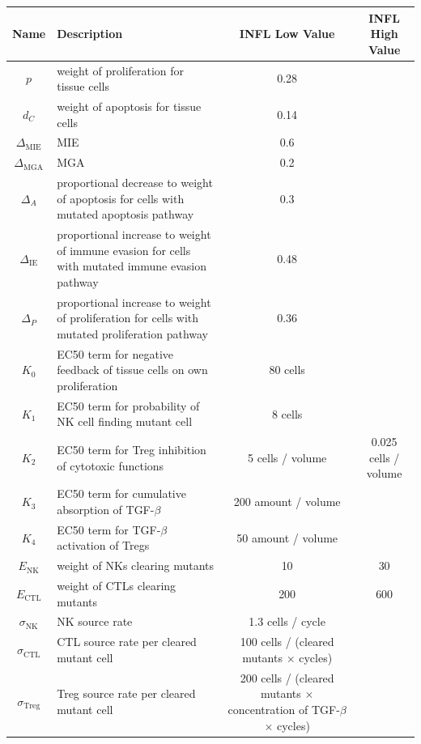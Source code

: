 \documentclass[11pt, a4paper, preprint]{article}
\begin{document}
\begin{table}[H]
\begin{center}
 \begin{tabular}{|| c | p{7cm} | c | c ||} 
 \hline
 Name & Description & INFL Low Value & INFL High Value  \\ [0.5ex] 
 \hline\hline
  $p$ & weight of proliferation for tissue cells & 0.28 & \\ 
 \hline
 $d_C$  & weight of apoptosis for tissue cells & 0.14 & \\
 \hline
$\Delta_\text{MIE}$ & MIE & 0.6 & \\
 \hline
 $\Delta_\text{MGA}$ & MGA  & 0.2 &  \\
 \hline
  $\Delta_A$ & proportional decrease to weight of apoptosis for cells with mutated apoptosis pathway & 0.3 &  \\
  \hline
  $\Delta_\text{IE}$ & proportional increase to weight of immune evasion for cells with mutated immune evasion pathway & 0.48 &  \\
  \hline
  $\Delta_P$ & proportional increase to weight of proliferation for cells with mutated proliferation pathway & 0.36 &  \\
  \hline
 $K_0$ & EC50 term for negative feedback of tissue cells on own proliferation & 80 cells& \\
 \hline
 $K_1$ & EC50 term for probability of NK cell finding mutant cell & 8 cells& \\
 \hline
  $K_2$ & EC50 term for Treg inhibition of cytotoxic functions & 5 cells / volume & 0.025 cells / volume \\
  \hline
  $K_3$ & EC50 term for cumulative absorption of TGF-$\beta$ & 200 amount / volume & \\
  \hline
  $K_4$ & EC50 term for TGF-$\beta$ activation of Tregs & 50 amount / volume & \\
  \hline
 $E_\text{NK}$ & weight of NKs clearing mutants & 10 & 30  \\
  \hline
  $E_\text{CTL}$ & weight of CTLs clearing mutants & 200 & 600 \\
  \hline
  $\sigma_\text{NK}$ & NK source rate & 1.3 cells / cycle &  \\ 
  \hline
  $\sigma_\text{CTL}$ & CTL source rate per cleared mutant cell & 100 cells / (cleared mutants $\times$ cycles)& \\ 
  \hline
  $\sigma_\text{Treg}$ & Treg source rate per cleared mutant cell & 200 cells / (cleared mutants $\times$ concentration of TGF-$\beta$ $\times$ cycles)& \\ 

\end{tabular}
\end{center}
\end{table}
\end{document}
